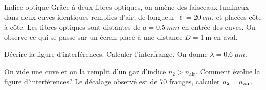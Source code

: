 \begin{exo}[PC][1][oral]{Indice optique}
  Grâce à deux fibres optiques, on amène des faisceaux lumineux dans deux cuves identiques remplies d'air, de longueur $\ell=\SI{20}{cm}$, et placées côte à côte. Les fibres optiques sont distantes de $a=\SI{0.5}{mm}$ en entrée des cuves. On observe ce qui se passe sur un écran placé à une distance $D=1 \mathrm{~m}$ en aval.

  \begin{quest}
    \item Décrire la figure d'interférences. Calculer l'interfrange. On donne $\lambda=\SI{0.6}{\mu m}$.

    \item On vide une cuve et on la remplit d'un gaz d'indice $n_{2}>n_{\text {air}}$. Comment évolue la figure d'interférences? Le décalage observé est de 70 franges, calculer $n_{2}-n_{\rm air}$.

  \end{quest}
\end{exo}

